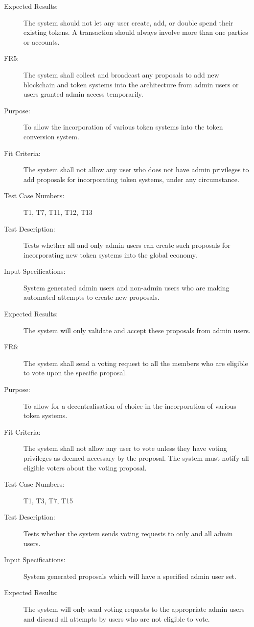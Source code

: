 \documentclass[a4paper,twoside,phd]{BYUPhys}
\begin{document}
\begin{description}
\item[Expected Results:] The system should not let any user create, add, or double spend their existing tokens. A transaction should always involve more than one parties or accounts.
\\
\item[FR5:] The system shall collect and broadcast any proposals to add new blockchain and token systems into the architecture from admin users or users granted admin access temporarily.
\item[Purpose:] To allow the incorporation of various token systems into the token conversion system.
\item[Fit Criteria:] The system shall not allow any user who does not have admin privileges to add proposals for incorporating token systems, under any circumstance.
\item[Test Case Numbers:] T1, T7, T11, T12, T13
\item[Test Description:] Tests whether all and only admin users can create such proposals for incorporating new token systems into the global economy.
\item[Input Specifications:] System generated admin users and non-admin users who are making automated attempts to create new proposals.
\item[Expected Results:] The system will only validate and accept these proposals from admin users.
\\
\item[FR6:] The system shall send a voting request to all the members who are eligible to vote upon the specific proposal.
\item[Purpose:] To allow for a decentralisation of choice in the incorporation of various token systems.
\item[Fit Criteria:] The system shall not allow any user to vote unless they have voting privileges as deemed necessary by the proposal. The system must notify all eligible voters about the voting proposal.
\item[Test Case Numbers:] T1, T3, T7, T15
\item[Test Description:] Tests whether the system sends voting requests to only and all admin users.
\item[Input Specifications:] System generated proposals which will have a specified admin user set. 
\item[Expected Results:] The system will only send voting requests to the appropriate admin users and discard all attempts by users who are not eligible to vote.

\end{description}
\end{document}
